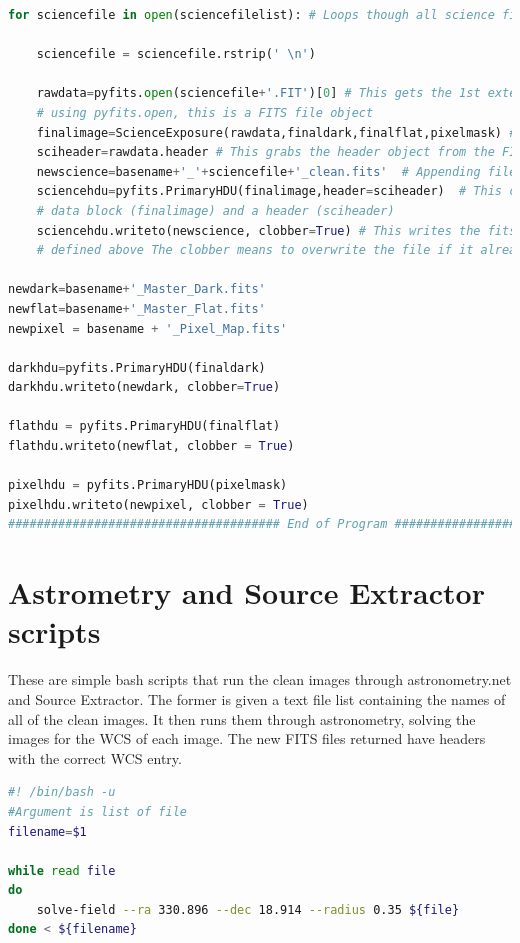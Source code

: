 \documentclass{aastex61}
\begin{document}
\begin{lstlisting}[language=Python, caption= Cleans science images (YM)]
for sciencefile in open(sciencefilelist): # Loops though all science files to apply finaldark and finalflat corrections
	
	sciencefile = sciencefile.rstrip(' \n')
	
	rawdata=pyfits.open(sciencefile+'.FIT')[0] # This gets the 1st extension (starts with 0!), this is an example of 
	# using pyfits.open, this is a FITS file object
	finalimage=ScienceExposure(rawdata,finaldark,finalflat,pixelmask) # Find function above
	sciheader=rawdata.header # This grabs the header object from the FITS object rawdata
	newscience=basename+'_'+sciencefile+'_clean.fits'  # Appending filenames onto the base
	sciencehdu=pyfits.PrimaryHDU(finalimage,header=sciheader)  # This converts a numpy array into a FITS object with a 
	# data block (finalimage) and a header (sciheader)
	sciencehdu.writeto(newscience, clobber=True) # This writes the fits object to the file name newscience, which is 
	# defined above The clobber means to overwrite the file if it already exists.

newdark=basename+'_Master_Dark.fits'
newflat=basename+'_Master_Flat.fits'
newpixel = basename + '_Pixel_Map.fits'

darkhdu=pyfits.PrimaryHDU(finaldark)
darkhdu.writeto(newdark, clobber=True)

flathdu = pyfits.PrimaryHDU(finalflat)
flathdu.writeto(newflat, clobber = True)

pixelhdu = pyfits.PrimaryHDU(pixelmask)
pixelhdu.writeto(newpixel, clobber = True)
###################################### End of Program ##########################################
\end{lstlisting}

\section{Astrometry and Source Extractor scripts} \label{code: astro sex}
These are simple bash scripts that run the clean images through astronometry.net and Source Extractor. The former is given a text file list containing the names of all of the clean images. It then runs them through astronometry, solving the images for the WCS of each image. The new FITS files returned have headers with the correct WCS entry.
\begin{lstlisting}[language = bash, caption= Runs clean images through astronometry.net (YM)]
#! /bin/bash -u
#Argument is list of file 
filename=$1

while read file
do
	solve-field --ra 330.896 --dec 18.914 --radius 0.35 ${file}  
done < ${filename}
\end{lstlisting} 
\end{document}
